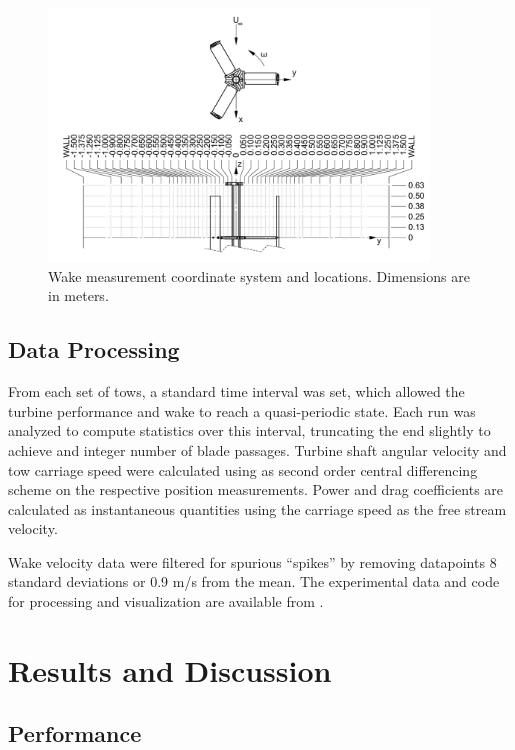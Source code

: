 \documentclass[energies,article,accept,moreauthors,pdftex,12pt,a4paper]{mdpi}
\begin{document}
\begin{figure}
\centering
\includegraphics[width=0.9\textwidth]{figures/turbine_coordinate_system}
\caption{Wake measurement coordinate system and locations. Dimensions are in
meters.}
\label{fig:wake-locations}
\end{figure}


\subsection{Data Processing}

From each set of tows, a standard time interval was set, which allowed the
turbine performance and wake to reach a quasi-periodic state. Each run was
analyzed to compute statistics over this interval, truncating the end slightly
to achieve and integer number of blade passages. Turbine shaft angular velocity
and tow carriage speed were calculated using as second order central
differencing scheme on the respective position measurements. Power and drag
coefficients are calculated as instantaneous quantities using the carriage speed
as the free stream velocity.

Wake velocity data were filtered for spurious ``spikes'' by removing datapoints
8 standard deviations or 0.9 m/s from the mean. The experimental data and code
for processing and visualization are available from
\cite{Bachant2015-RVAT-Re-dep-data}.


\section{Results and Discussion}


\subsection{Performance}
\end{document}
